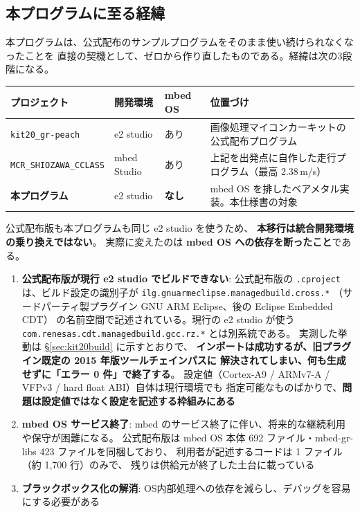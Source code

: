 \documentclass[a4paper,11pt,dvipdfmx]{jsarticle}
\begin{document}
\subsection{本プログラムに至る経緯}\label{sec:lineage}

本プログラムは、公式配布のサンプルプログラムをそのまま使い続けられなくなったことを
直接の契機として、ゼロから作り直したものである。経緯は次の3段階になる。

\begin{tabularx}{\textwidth}{l l l X}
\toprule
\textbf{プロジェクト} & \textbf{開発環境} & \textbf{mbed OS} & \textbf{位置づけ} \\
\midrule
\texttt{kit20\_gr-peach} & e2 studio & あり & 画像処理マイコンカーキットの公式配布プログラム \\
\texttt{MCR\_SHIOZAWA\_CCLASS} & mbed Studio & あり & 上記を出発点に自作した走行プログラム（最高 2.38\,m/s） \\
\textbf{本プログラム} & e2 studio & \textbf{なし} & mbed OS を排したベアメタル実装。本仕様書の対象 \\
\bottomrule
\end{tabularx}

\vspace{2mm}
公式配布版も本プログラムも同じ e2 studio を使うため、
\textbf{本移行は統合開発環境の乗り換えではない}。
実際に変えたのは \textbf{mbed OS への依存を断ったこと}である。

\begin{cautionbox}[開発環境の課題]
\begin{enumerate}[nosep]
  \item \textbf{公式配布版が現行 e2 studio でビルドできない}:
        公式配布版の \texttt{.cproject} は、ビルド設定の識別子が
        \texttt{ilg.gnuarmeclipse.managedbuild.cross.*}
        （サードパーティ製プラグイン GNU ARM Eclipse、後の Eclipse Embedded CDT）
        の名前空間で記述されている。現行の e2 studio が使う
        \texttt{com.renesas.cdt.managedbuild.gcc.rz.*} とは別系統である。
        実測した挙動は \hyperref[sec:kit20build]{§\ref*{sec:kit20build}} に示すとおりで、
        \textbf{インポートは成功するが、旧プラグイン既定の 2015 年版ツールチェインパスに
        解決されてしまい、何も生成せずに「エラー 0 件」で終了する}。
        設定値（Cortex-A9 / ARMv7-A / VFPv3 / hard float ABI）自体は現行環境でも
        指定可能なものばかりで、\textbf{問題は設定値ではなく設定を記述する枠組みにある}
  \item \textbf{mbed OS サービス終了}: mbed のサービス終了に伴い、将来的な継続利用や保守が困難になる。
        公式配布版は mbed OS 本体 692 ファイル・mbed-gr-libs 423 ファイルを同梱しており、
        利用者が記述するコードは 1 ファイル（約 1,700 行）のみで、
        残りは供給元が終了した土台に載っている
  \item \textbf{ブラックボックス化の解消}: OS内部処理への依存を減らし、デバッグを容易にする必要がある
\end{enumerate}
\end{cautionbox}
\end{document}
